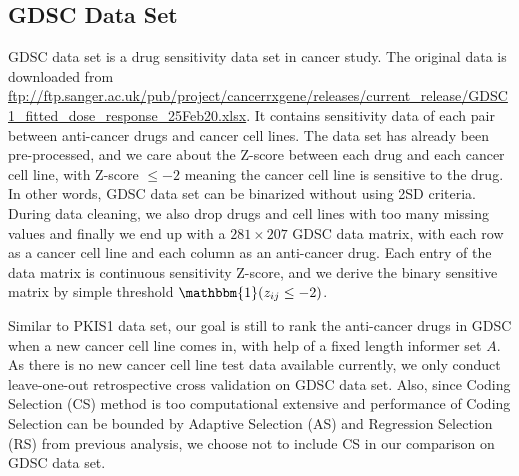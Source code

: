 \documentclass[12pt]{article}
\begin{document}
\subsection{GDSC Data Set}
GDSC data set is a drug sensitivity data set in cancer study. The original data is downloaded from \url{ftp://ftp.sanger.ac.uk/pub/project/cancerrxgene/releases/current_release/GDSC1_fitted_dose_response_25Feb20.xlsx}. It contains sensitivity data of each pair between anti-cancer drugs and cancer cell lines. The data set has already been pre-processed, and we care about the Z-score between each drug and each cancer cell line, with Z-score $\leq -2$ meaning the cancer cell line is sensitive to the drug. In other words, GDSC data set can be binarized without using 2SD criteria. During data cleaning, we also drop drugs and cell lines with too many missing values and finally we end up with a $281\times 207$ GDSC data matrix, with each row as a cancer cell line and each column as an anti-cancer drug. Each entry of the data matrix is continuous sensitivity Z-score, and we derive the binary sensitive matrix by simple threshold $\mathbbm{1}(z_{ij}\leq -2)$. 

Similar to PKIS1 data set, our goal is still to rank the anti-cancer drugs in GDSC when a new cancer cell line comes in, with help of a fixed length informer set $A$. As there is no new cancer cell line test data available currently, we only conduct leave-one-out retrospective cross validation on GDSC data set. Also, since Coding Selection (CS) method is too computational extensive and  performance of Coding Selection can be bounded by Adaptive Selection (AS) and Regression Selection (RS) from previous analysis, we choose not to include CS in our comparison on GDSC data set. 
\end{document}
